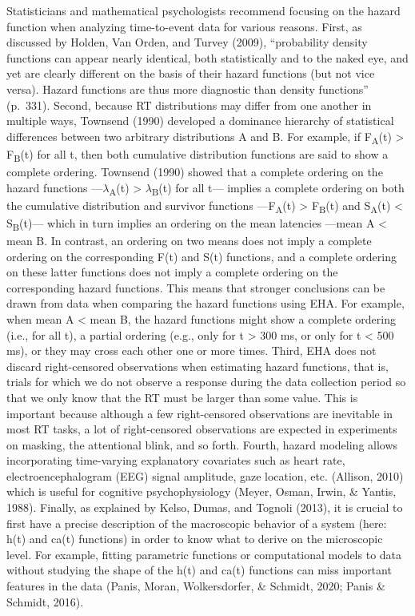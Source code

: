 \documentclass[
  man,floatsintext]{apa6}
\begin{document}
Statisticians and mathematical psychologists recommend focusing on the hazard function when analyzing time-to-event data for various reasons. First, as discussed by Holden, Van Orden, and Turvey (2009), ``probability density functions can appear nearly identical, both statistically and to the naked eye, and yet are clearly different on the basis of their hazard functions (but not vice versa). Hazard functions are thus more diagnostic than density functions'' (p.~331).
Second, because RT distributions may differ from one another in multiple ways, Townsend (1990) developed a dominance hierarchy of statistical differences between two arbitrary distributions A and B. For example, if F\textsubscript{A}(t) \textgreater{} F\textsubscript{B}(t) for all t, then both cumulative distribution functions are said to show a complete ordering. Townsend (1990) showed that a complete ordering on the hazard functions ---\(\lambda\)\textsubscript{A}(t) \textgreater{} \(\lambda\)\textsubscript{B}(t) for all t--- implies a complete ordering on both the cumulative distribution and survivor functions ---F\textsubscript{A}(t) \textgreater{} F\textsubscript{B}(t) and S\textsubscript{A}(t) \textless{} S\textsubscript{B}(t)--- which in turn implies an ordering on the mean latencies ---mean A \textless{} mean B. In contrast, an ordering on two means does not imply a complete ordering on the corresponding F(t) and S(t) functions, and a complete ordering on these latter functions does not imply a complete ordering on the corresponding hazard functions. This means that stronger conclusions can be drawn from data when comparing the hazard functions using EHA. For example, when mean A \textless{} mean B, the hazard functions might show a complete ordering (i.e., for all t), a partial ordering (e.g., only for t \textgreater{} 300 ms, or only for t \textless{} 500 ms), or they may cross each other one or more times.
Third, EHA does not discard right-censored observations when estimating hazard functions, that is, trials for which we do not observe a response during the data collection period so that we only know that the RT must be larger than some value. This is important because although a few right-censored observations are inevitable in most RT tasks, a lot of right-censored observations are expected in experiments on masking, the attentional blink, and so forth.
Fourth, hazard modeling allows incorporating time-varying explanatory covariates such as heart rate, electroencephalogram (EEG) signal amplitude, gaze location, etc. (Allison, 2010) which is useful for cognitive psychophysiology (Meyer, Osman, Irwin, \& Yantis, 1988).
Finally, as explained by Kelso, Dumas, and Tognoli (2013), it is crucial to first have a precise description of the macroscopic behavior of a system (here: h(t) and ca(t) functions) in order to know what to derive on the microscopic level. For example, fitting parametric functions or computational models to data without studying the shape of the h(t) and ca(t) functions can miss important features in the data (Panis, Moran, Wolkersdorfer, \& Schmidt, 2020; Panis \& Schmidt, 2016).
\end{document}
